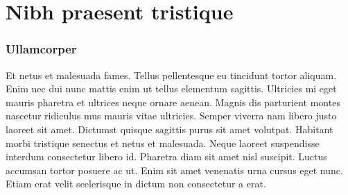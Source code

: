 \documentclass[../main.tex]{subfiles}
\begin{document}
\part[Nibh praesent tristique]{Nibh praesent tristique}
\section{Ullamcorper}
    Et netus et malesuada fames. Tellus pellentesque eu tincidunt tortor aliquam. Enim nec 
    dui nunc mattis enim ut tellus elementum sagittis. Ultricies mi eget mauris pharetra et 
    ultrices neque ornare aenean. Magnis dis parturient montes nascetur ridiculus mus mauris 
    vitae ultricies. Semper viverra nam libero justo laoreet sit amet. Dictumst quisque 
    sagittis purus sit amet volutpat. Habitant morbi tristique senectus et netus et 
    malesuada. Neque laoreet suspendisse interdum consectetur libero id. Pharetra diam sit 
    amet nisl suscipit. Luctus accumsan tortor posuere ac ut. Enim sit amet venenatis urna 
    cursus eget nunc. Etiam erat velit scelerisque in dictum non consectetur a erat.
\end{document}
